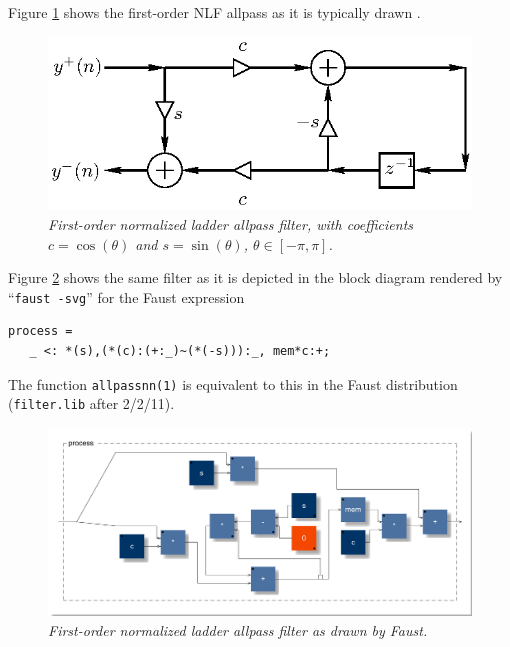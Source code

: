 \documentclass[twoside,a4paper]{article}
\begin{document}
Figure \ref{nlf} shows the first-order NLF allpass as it is typically
drawn \cite{MG,PASP}.

\begin{figure}[ht]
\centerline{\includegraphics{eps/nlf.eps}}
\caption{\label{nlf}{\it First-order normalized ladder allpass filter, with
coefficients $c=\cos(\theta)$ and $s=\sin(\theta)$, $\theta\in[-\pi,\pi]$.}}
\end{figure}

Figure \ref{nlf1} shows the same filter as it is depicted in the block diagram
rendered by ``\texttt{faust -svg}'' for the Faust expression
\begin{verbatim}
process = 
   _ <: *(s),(*(c):(+:_)~(*(-s))):_, mem*c:+;
\end{verbatim}
The function \texttt{allpassnn(1)} is equivalent to this in the Faust
distribution (\texttt{filter.lib} after 2/2/11).

\begin{figure}[ht]
\centerline{\includegraphics[scale=0.33]{fig/nlf1.pdf}}
\caption{\label{nlf1}{\it First-order normalized ladder allpass filter as drawn by Faust.}}
\end{figure}
\end{document}
